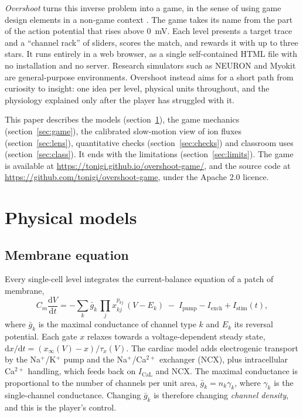 \documentclass[11pt,a4paper]{article}
\newcommand{\ICaL}{I_{\mathrm{CaL}}}
\begin{document}
\emph{Overshoot} turns this inverse problem into a game, in the sense of using game design elements in a non-game context \cite{Deterding2011}. The game takes its name from the part of the action potential that rises above \SI{0}{\milli\volt}. Each level presents a target trace and a ``channel rack'' of sliders, scores the match, and rewards it with up to three stars. It runs entirely in a web browser, as a single self-contained HTML file with no installation and no server. Research simulators such as NEURON \cite{HinesCarnevale1997} and Myokit \cite{Clerx2016} are general-purpose environments. Overshoot instead aims for a short path from curiosity to insight: one idea per level, physical units throughout, and the physiology explained only after the player has struggled with it.

This paper describes the models (section~\ref{sec:models}), the game mechanics (section~\ref{sec:game}), the calibrated slow-motion view of ion fluxes (section~\ref{sec:lens}), quantitative checks (section~\ref{sec:checks}) and classroom uses (section~\ref{sec:class}). It ends with the limitations (section~\ref{sec:limits}). The game is available at \url{https://tonigi.github.io/overshoot-game/}, and the source code at \url{https://github.com/tonigi/overshoot-game}, under the Apache 2.0 licence.

\section{Physical models}\label{sec:models}

\subsection{Membrane equation}
Every single-cell level integrates the current-balance equation of a patch of membrane,
\begin{equation}
C_m \frac{\mathrm{d}V}{\mathrm{d}t} = -\sum_k \bar g_k \, \prod_j x_{kj}^{p_{kj}} \,(V - E_k) \; - \; I_{\mathrm{pump}} - I_{\mathrm{exch}} + I_{\mathrm{stim}}(t),
\label{eq:membrane}
\end{equation}
where $\bar g_k$ is the maximal conductance of channel type $k$ and $E_k$ its reversal potential. Each gate $x$ relaxes towards a voltage-dependent steady state,
$\mathrm{d}x/\mathrm{d}t = \left(x_\infty(V)-x\right)/\tau_x(V)$.
The cardiac model adds electrogenic transport by the Na$^+$/K$^+$ pump and the Na$^+$/Ca$^{2+}$ exchanger (NCX), plus intracellular Ca$^{2+}$ handling, which feeds back on $\ICaL$ and NCX. The maximal conductance is proportional to the number of channels per unit area, $\bar g_k = n_k \gamma_k$, where $\gamma_k$ is the single-channel conductance. Changing $\bar g_k$ is therefore changing \emph{channel density}, and this is the player's control.
\end{document}
